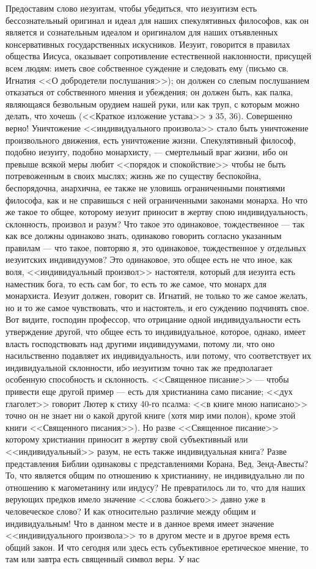 \documentclass[12pt]{article}
\begin{document}
Предоставим слово иезуитам, чтобы убедиться, что иезуитизм есть бессознательный оригинал и идеал для наших спекулятивных философов, как он является и сознательным идеалом и оригиналом для наших отъявленных консервативных государственных искусников. Иезуит, говорится в правилах общества Иисуса, оказывает сопротивление естественной наклонности, присущей всем людям: иметь свое собственное суждение и следовать ему (письмо св. Игнатия <<О добродетели послушания>>); он должен со слепым послушанием отказаться от собственного мнения и убеждения; он должен быть, как палка, являющаяся безвольным орудием нашей руки, или как труп, с которым можно делать, что хочешь (<<Краткое изложение устава>>  э 35, 36). Совершенно верно! Уничтожение <<индивидуального произвола>>  стало быть уничтожение произвольного движения, есть уничтожение жизни. Спекулятивный философ, подобно иезуиту, подобно монархисту, --- смертельный враг жизни, ибо он превыше всякой меры любит <<порядок и спокойствие>>  чтобы не быть потревоженным в своих мыслях; жизнь же по существу беспокойна, беспорядочна, анархична, ее также не уловишь ограниченными понятиями философа, как и не справишься с ней ограниченными законами монарха. Но что же такое то общее, которому иезуит приносит в жертву спою индивидуальность, склонность, произвол и разум? Что такое это одинаковое, тождественное --- так как все должны одинаково знать, одинаково говорить согласно указанным правилам --- что такое, повторяю я, это одинаковое, тождественное у отдельных иезуитских индивидуумов? Это одинаковое, это общее есть не что иное, как воля, <<индивидуальный произвол>> настоятеля, который для иезуита есть наместник бога, то есть сам бог, то есть то же самое, что монарх для монархиста. Иезуит должен, говорит св. Игнатий, не только то же самое желать, но и то же самое чувствовать, что и настоятель, и его суждению подчинять свое. Вот видите, господин профессор, что отрицание одной индивидуальности есть утверждение другой, что общее есть то индивидуальное, которое, однако, имеет власть господствовать над другими индивидуумами, потому ли, что оно насильственно подавляет их индивидуальность, или потому, что соответствует их индивидуальной склонности, ибо иезуитизм точно так же предполагает особенную способность и склонность. <<Священное писание>> --- чтобы привести еще другой пример --- есть для христианина само писание; <<дух глаголет>>  говорит Лютер к стиху 40-го псалма: <<в книге мною написано>>  точно он не знает ни о какой другой книге (хотя мир ими полон), кроме этой книги <<Священного писания>>). Но разве <<Священное писание>>  которому христианин приносит в жертву свой субъективный или <<индивидуальный>> разум, не есть также индивидуальная книга? Разве представления Библии одинаковы с представлениями Корана, Вед, Зенд-Авесты? То, что является общим по отношению к христианину, не индивидуально ли по отношению к магометанину или индусу? Не превратилось ли то, что для наших верующих предков имело значение <<слова божьего>>  давно уже в человеческое слово? И как относительно различие между общим и индивидуальным! Что в данном месте и в данное время имеет значение <<индивидуального произвола>>  то в другом месте и в другое время есть общий закон. И что сегодня или здесь есть субъективное еретическое мнение, то там или завтра есть священный символ веры. У нас 
\end{document}
